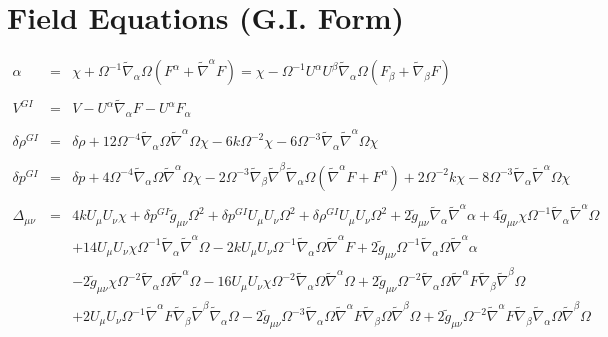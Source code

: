 \documentclass[10pt,letterpaper]{article}
\numberwithin{equation}{section}
\begin{document}
\section{Field Equations (G.I. Form)}
\begin{eqnarray}
\alpha  &=& \chi + \Omega^{-1}\tilde\nabla_\alpha \Omega(F^\alpha + \tilde\nabla^\alpha F) = 
\chi - \Omega^{-1}U^\alpha U^\beta\tilde\nabla_\alpha \Omega(F_\beta + \tilde\nabla_\beta F)
\\ \nonumber\\
V^{GI} &=& V-U^\alpha \tilde\nabla_\alpha F - U^\alpha F_\alpha
\\ \nonumber\\
\delta \rho^{GI}&=&\delta \rho +12\Omega^{-4}\tilde\nabla_\alpha\Omega\tilde\nabla^\alpha\Omega\chi-6k\Omega^{-2}\chi
-6\Omega^{-3}\tilde\nabla_\alpha\tilde\nabla^\alpha\Omega \chi
\\ \nonumber\\ 
\delta p^{GI}&=&\delta p +4\Omega^{-4}\tilde\nabla_\alpha\Omega\tilde\nabla^\alpha\Omega\chi -2\Omega^{-3}\tilde\nabla_\beta\tilde\nabla^\beta\tilde\nabla_\alpha\Omega(\tilde\nabla^\alpha F + F^\alpha)
+2\Omega^{-2}k \chi -8\Omega^{-3}\tilde\nabla_\alpha\tilde\nabla^\alpha\Omega\chi
\\ \nonumber\\
\Delta_{\mu\nu}&=& 4 k U_{\mu } U_{\nu } \chi + \delta p^{GI}{} \tilde{g}_{\mu \nu } \Omega^2 + \delta p^{GI}{} U_{\mu } U_{\nu } \Omega^2 + \delta \rho^{GI}{} U_{\mu } U_{\nu } \Omega^2 + 2 \tilde{g}_{\mu \nu } \tilde{\nabla}_{\alpha }\tilde{\nabla}^{\alpha }\alpha + 4 \tilde{g}_{\mu \nu } \chi \Omega^{-1} \tilde{\nabla}_{\alpha }\tilde{\nabla}^{\alpha }\Omega \nonumber \\ 
&& + 14 U_{\mu } U_{\nu } \chi \Omega^{-1} \tilde{\nabla}_{\alpha }\tilde{\nabla}^{\alpha }\Omega - 2 k U_{\mu } U_{\nu } \Omega^{-1} \tilde{\nabla}_{\alpha }\Omega \tilde{\nabla}^{\alpha }F + 2 \tilde{g}_{\mu \nu } \Omega^{-1} \tilde{\nabla}_{\alpha }\Omega \tilde{\nabla}^{\alpha }\alpha \nonumber \\ 
&& - 2 \tilde{g}_{\mu \nu } \chi \Omega^{-2} \tilde{\nabla}_{\alpha }\Omega \tilde{\nabla}^{\alpha }\Omega - 16 U_{\mu } U_{\nu } \chi \Omega^{-2} \tilde{\nabla}_{\alpha }\Omega \tilde{\nabla}^{\alpha }\Omega + 2 \tilde{g}_{\mu \nu } \Omega^{-2} \tilde{\nabla}_{\alpha }\Omega \tilde{\nabla}^{\alpha }F \tilde{\nabla}_{\beta }\tilde{\nabla}^{\beta }\Omega \nonumber \\ 
&& + 2 U_{\mu } U_{\nu } \Omega^{-1} \tilde{\nabla}^{\alpha }F \tilde{\nabla}_{\beta }\tilde{\nabla}^{\beta }\tilde{\nabla}_{\alpha }\Omega - 2 \tilde{g}_{\mu \nu } \Omega^{-3} \tilde{\nabla}_{\alpha }\Omega \tilde{\nabla}^{\alpha }F \tilde{\nabla}_{\beta }\Omega \tilde{\nabla}^{\beta }\Omega + 2 \tilde{g}_{\mu \nu } \Omega^{-2} \tilde{\nabla}^{\alpha }F \tilde{\nabla}_{\beta }\tilde{\nabla}_{\alpha }\Omega \tilde{\nabla}^{\beta }\Omega \nonumber \\ 

\end{eqnarray}
\end{document}
